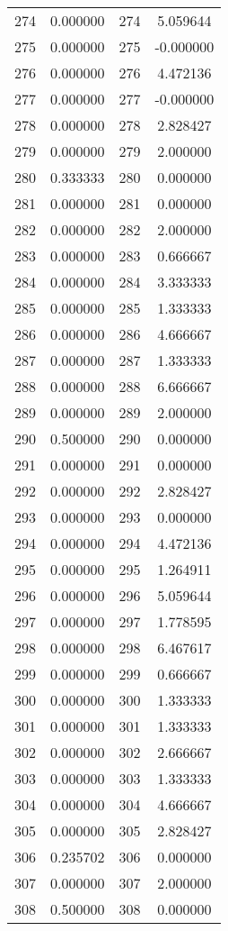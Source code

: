 \documentclass[12pt]{article}
\begin{document}
\begin{longtable}{@{}cccc@{}}
274 & 0.000000 & 274 & 5.059644 \\
275 & 0.000000 & 275 & -0.000000 \\
276 & 0.000000 & 276 & 4.472136 \\
277 & 0.000000 & 277 & -0.000000 \\
278 & 0.000000 & 278 & 2.828427 \\
279 & 0.000000 & 279 & 2.000000 \\
280 & 0.333333 & 280 & 0.000000 \\
281 & 0.000000 & 281 & 0.000000 \\
282 & 0.000000 & 282 & 2.000000 \\
283 & 0.000000 & 283 & 0.666667 \\
284 & 0.000000 & 284 & 3.333333 \\
285 & 0.000000 & 285 & 1.333333 \\
286 & 0.000000 & 286 & 4.666667 \\
287 & 0.000000 & 287 & 1.333333 \\
288 & 0.000000 & 288 & 6.666667 \\
289 & 0.000000 & 289 & 2.000000 \\
290 & 0.500000 & 290 & 0.000000 \\
291 & 0.000000 & 291 & 0.000000 \\
292 & 0.000000 & 292 & 2.828427 \\
293 & 0.000000 & 293 & 0.000000 \\
294 & 0.000000 & 294 & 4.472136 \\
295 & 0.000000 & 295 & 1.264911 \\
296 & 0.000000 & 296 & 5.059644 \\
297 & 0.000000 & 297 & 1.778595 \\
298 & 0.000000 & 298 & 6.467617 \\
299 & 0.000000 & 299 & 0.666667 \\
300 & 0.000000 & 300 & 1.333333 \\
301 & 0.000000 & 301 & 1.333333 \\
302 & 0.000000 & 302 & 2.666667 \\
303 & 0.000000 & 303 & 1.333333 \\
304 & 0.000000 & 304 & 4.666667 \\
305 & 0.000000 & 305 & 2.828427 \\
306 & 0.235702 & 306 & 0.000000 \\
307 & 0.000000 & 307 & 2.000000 \\
308 & 0.500000 & 308 & 0.000000 \\

\end{longtable}
\end{document}
